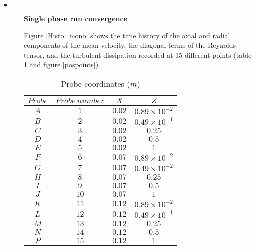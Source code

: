 \begin{description}
   \item[$\bullet$]\textbf{Single phase run convergence}

         Figure \ref{Histo_mono} shows the time history of the axial and radial components of the mean velocity, the diagonal terms of the Reynolds tensor, and the turbulent dissipation recorded at 15 different points (table \ref{tab_capteur} and figure \ref{pospoints})

         \begin{table}[H]
            \begin{center}
               \begin{tabular}{|c|c|c|c|}
                  \hline
                  $Probe$ & $Probe~number$ & $X$ & $Z$ \\
                  \hline
                  $A$ & $1$ & $0.02$ & $0.89 \times 10^{-2}$ \\
                  \hline
                  $B$ & $2$ & $0.02$ & $0.49 \times 10^{-1}$ \\
                  \hline
                  $C$ & $3$ & $0.02$ & $0.25$         \\
                  \hline
                  $D$ & $4$ & $0.02$ & $0.5$          \\
                  \hline
                  $E$ & $5$ & $0.02$ & $1$            \\
                  \hline
                  $F$ & $6$ & $0.07$ & $0.89 \times 10^{-2}$ \\
                  \hline
                  $G$ & $7$ & $0.07$ & $0.49 \times 10^{-2}$ \\
                  \hline
                  $H$ & $8$ & $0.07$ & $0.25$         \\
                  \hline
                  $I$ & $9$ & $0.07$ & $0.5$          \\
                  \hline
                  $J$ & $10$ & $0.07$ & $1$            \\
                  \hline
                  $K$ & $11$ & $0.12$ & $0.89 \times 10^{-2}$ \\
                  \hline
                  $L$ & $12$ & $0.12$ & $0.49 \times 10^{-1}$ \\
                  \hline
                  $M$ & $13$ & $0.12$ & $0.25$         \\
                  \hline
                  $N$ & $14$ & $0.12$ & $0.5$          \\
                  \hline
                  $P$ & $15$ & $0.12$ & $1$            \\
                  \hline
               \end{tabular}
               \caption{Probe coordinates ($m$)}
               \label{tab_capteur}
            \end{center}
         \end{table}


\end{description}
